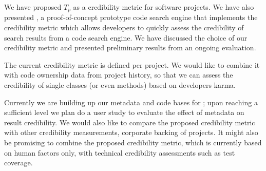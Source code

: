 
We have proposed $T_p$ as a credibility metric for software projects.  We have also presented \Jbd, a proof-of-concept prototype code search engine that implements the credibility metric which allows developers to quickly assess the credibility of search results from a code search engine. We have discussed the choice of our credibility metric and presented preliminary results from an ongoing evaluation. 


The current credibility metric is defined per project. We would like to combine it with code ownership data from project history, so that we can assess the credibility of single classes (or even methods) based on developers karma.

Currently we are building up our metadata and code bases for \Jbd; upon reaching a sufficient level we plan do a user study to evaluate the effect of metadata on result credibility. We would also like to compare the proposed credibility metric with other credibility measurements, \eg corporate backing of projects. It might also be promising to combine the proposed credibility metric, which is currently based on human factors only, with technical credibility assessments such as \eg test coverage. 

